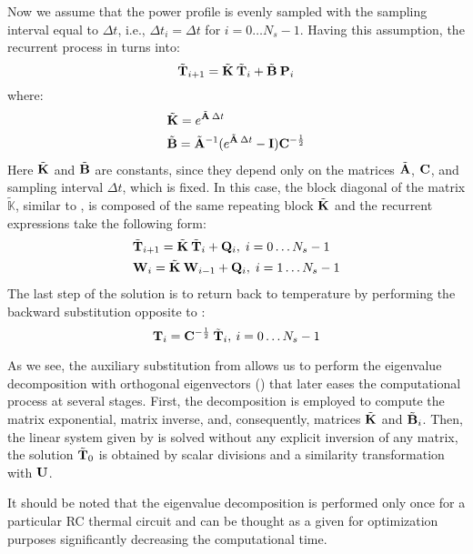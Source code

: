 Now we assume that the power profile is evenly sampled with the sampling interval equal to $\Delta t$, i.e., $\Delta t_i = \Delta t$ for $i = 0 \dots N_s - 1$. Having this assumption, the recurrent process in  turns into:
\[
  \tilde{\mathbf{T}}_{i+1} = \tilde{\mathbf{K}} \: \tilde{\mathbf{T}}_i + \tilde{\mathbf{B}} \: \mathbf{P}_i
\]
where:
\begin{align*}
  & \tilde{\mathbf{K}} = e^{\tilde{\mathbf{A}} \: \Delta t} \\
  & \tilde{\mathbf{B}} = \tilde{\mathbf{A}}^{-1} ( e^{\tilde{\mathbf{A}} \: \Delta t} - \mathbf{I} ) \mathbf{C}^{-\frac{1}{2}}
\end{align*}
Here $\tilde{\mathbf{K}}$ and $\tilde{\mathbf{B}}$ are constants, since they depend only on the matrices $\tilde{\mathbf{A}}$, $\mathbf{C}$, and sampling interval $\Delta t$, which is fixed. In this case, the block diagonal of the matrix $\tilde{\mathbb{K}}$, similar to , is composed of the same repeating block $\tilde{\mathbf{K}}$ and the recurrent expressions take the following form:
\begin{align}
  & \tilde{\mathbf{T}}_{i + 1} = \tilde{\mathbf{K}} \: \tilde{\mathbf{T}}_i + \mathbf{Q}_i, \; i = 0 \dots N_s - 1 \nonumber \\
  & \mathbf{W}_i = \tilde{\mathbf{K}} \: \mathbf{W}_{i - 1} + \mathbf{Q}_i, \; i = 1 \dots N_s - 1 \nonumber
\end{align}
The last step of the solution is to return back to temperature by performing the backward substitution opposite to :
\[
  \mathbf{T}_i = \mathbf{C}^{-\frac{1}{2}} \: \tilde{\mathbf{T}}_i, \: i = 0 \dots N_s - 1
\]

As we see, the auxiliary substitution from  allows us to perform the eigenvalue decomposition with orthogonal eigenvectors () that later eases the computational process at several stages. First, the decomposition is employed to compute the matrix exponential, matrix inverse, and, consequently, matrices $\tilde{\mathbf{K}}$ and $\tilde{\mathbf{B}}_i$. Then, the linear system given by  is solved without any explicit inversion of any matrix, the solution $\tilde{\mathbf{T}}_0$ is obtained by scalar divisions and a similarity transformation with $\mathbf{U}$.

It should be noted that the eigenvalue decomposition is performed only once for a particular RC thermal circuit and can be thought as a given for optimization purposes significantly decreasing the computational time.
